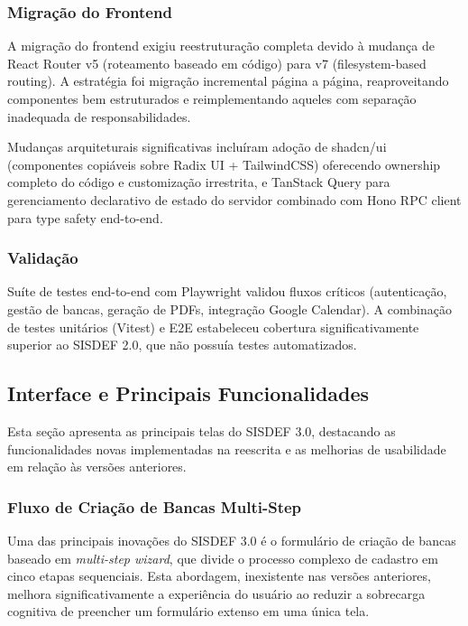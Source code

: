 \documentclass[nonacm, sigconf]{acmart}
\begin{document}
\subsubsection{Migração do Frontend}

A migração do frontend exigiu reestruturação completa devido à mudança de React Router v5 (roteamento baseado em código) para v7 (filesystem-based routing). A estratégia foi migração incremental página a página, reaproveitando componentes bem estruturados e reimplementando aqueles com separação inadequada de responsabilidades.

Mudanças arquiteturais significativas incluíram adoção de shadcn/ui (componentes copiáveis sobre Radix UI + TailwindCSS) oferecendo ownership completo do código e customização irrestrita, e TanStack Query para gerenciamento declarativo de estado do servidor combinado com Hono RPC client para type safety end-to-end.

\subsubsection{Validação}

Suíte de testes end-to-end com Playwright validou fluxos críticos (autenticação, gestão de bancas, geração de PDFs, integração Google Calendar). A combinação de testes unitários (Vitest) e E2E estabeleceu cobertura significativamente superior ao SISDEF 2.0, que não possuía testes automatizados.



\subsection{Interface e Principais Funcionalidades}
\label{section:ui-features}

Esta seção apresenta as principais telas do SISDEF 3.0, destacando as funcionalidades novas implementadas na reescrita e as melhorias de usabilidade em relação às versões anteriores.

\subsubsection{Fluxo de Criação de Bancas Multi-Step}

Uma das principais inovações do SISDEF 3.0 é o formulário de criação de bancas baseado em \textit{multi-step wizard}, que divide o processo complexo de cadastro em cinco etapas sequenciais. Esta abordagem, inexistente nas versões anteriores, melhora significativamente a experiência do usuário ao reduzir a sobrecarga cognitiva de preencher um formulário extenso em uma única tela.
\end{document}
